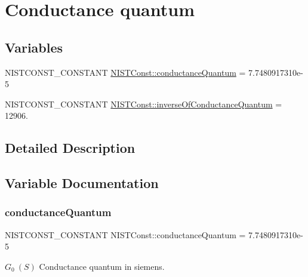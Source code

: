 \hypertarget{group___n_i_s_t_const-_conductance_quantum}{}\section{Conductance quantum}
\label{group___n_i_s_t_const-_conductance_quantum}
\subsection*{Variables}
\begin{DoxyCompactItemize}
\item 
N\+I\+S\+T\+C\+O\+N\+S\+T\+\_\+\+C\+O\+N\+S\+T\+A\+NT \mbox{\hyperlink{group___n_i_s_t_const-_conductance_quantum_ga134ad3777be531b9ba1313ef94a6885f}{N\+I\+S\+T\+Const\+::conductance\+Quantum}} = 7.\+7480917310e-\/5
\item 
N\+I\+S\+T\+C\+O\+N\+S\+T\+\_\+\+C\+O\+N\+S\+T\+A\+NT \mbox{\hyperlink{group___n_i_s_t_const-_conductance_quantum_ga629e01b406bd14e35a1de57795ac3a75}{N\+I\+S\+T\+Const\+::inverse\+Of\+Conductance\+Quantum}} = 12906.
\end{DoxyCompactItemize}


\subsection{Detailed Description}


\subsection{Variable Documentation}
\mbox{\label{group___n_i_s_t_const-_conductance_quantum_ga134ad3777be531b9ba1313ef94a6885f}} 
\subsubsection{\texorpdfstring{conductance\+Quantum}{conductanceQuantum}}
{\footnotesize\ttfamily N\+I\+S\+T\+C\+O\+N\+S\+T\+\_\+\+C\+O\+N\+S\+T\+A\+NT N\+I\+S\+T\+Const\+::conductance\+Quantum = 7.\+7480917310e-\/5}

$G_0 \ (S)$ Conductance quantum in siemens. \mbox{\label{group___n_i_s_t_const-_conductance_quantum_ga629e01b406bd14e35a1de57795ac3a75}} 
